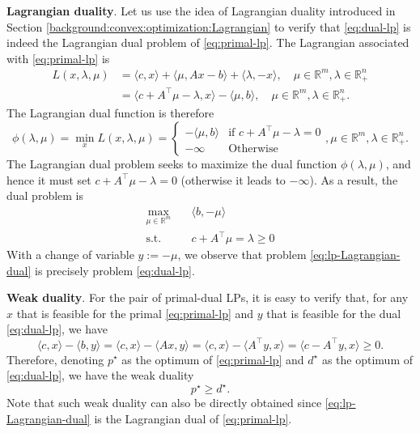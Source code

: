 \documentclass[
]{book}
\theoremstyle{definition}
\theoremstyle{definition}
\theoremstyle{definition}
\theoremstyle{definition}
\theoremstyle{remark}
\begin{document}
\textbf{Lagrangian duality}. Let us use the idea of Lagrangian duality introduced in Section \ref{background:convex:optimization:Lagrangian} to verify that \eqref{eq:dual-lp} is indeed the Lagrangian dual problem of \eqref{eq:primal-lp}. The Lagrangian associated with \eqref{eq:primal-lp} is
\begin{equation}
\begin{split}
L(x,\lambda,\mu) & = \langle c, x \rangle + \langle \mu, Ax - b \rangle + \langle \lambda, -x \rangle, \quad \mu \in \mathbb{R}^{m}, \lambda \in \mathbb{R}^{n}_{+}\\
& = \langle c + A^\top\mu - \lambda, x \rangle - \langle \mu, b \rangle, \quad \mu \in \mathbb{R}^{m}, \lambda \in \mathbb{R}^{n}_{+}.
\end{split}
\end{equation}
The Lagrangian dual function is therefore
\[
\phi(\lambda,\mu) = \min_{x} L(x,\lambda,\mu) = \begin{cases}
- \langle \mu, b \rangle & \text{if } c + A^\top\mu - \lambda = 0 \\
- \infty & \text{Otherwise}
\end{cases}, \mu \in \mathbb{R}^{m}, \lambda \in \mathbb{R}^{n}_{+}.
\]
The Lagrangian dual problem seeks to maximize the dual function \(\phi(\lambda,\mu)\), and hence it must set \(c + A^\top\mu - \lambda = 0\) (otherwise it leads to \(-\infty\)). As a result, the dual problem is
\begin{equation}
\begin{split}
\max_{\mu \in \mathbb{R}^{m}} & \quad \langle b, -\mu \rangle \\
\mathrm{s.t.}& \quad c + A^\top\mu = \lambda \geq 0
\end{split}
\label{eq:lp-Lagrangian-dual}
\end{equation}
With a change of variable \(y := -\mu\), we observe that problem \eqref{eq:lp-Lagrangian-dual} is precisely problem \eqref{eq:dual-lp}.

\textbf{Weak duality}. For the pair of primal-dual LPs, it is easy to verify that, for any \(x\) that is feasible for the primal \eqref{eq:primal-lp} and \(y\) that is feasible for the dual \eqref{eq:dual-lp}, we have
\begin{equation}
\langle c, x \rangle - \langle b, y \rangle = \langle c, x \rangle - \langle Ax, y \rangle = \langle c, x \rangle - \langle A^\top y, x \rangle = \langle c - A^\top y, x \rangle \geq 0.
\label{eq:weak-duality-lp}
\end{equation}
Therefore, denoting \(p^\star\) as the optimum of \eqref{eq:primal-lp} and \(d^\star\) as the optimum of \eqref{eq:dual-lp}, we have the weak duality
\[
p^\star \geq d^\star.
\]
Note that such weak duality can also be directly obtained since \eqref{eq:lp-Lagrangian-dual} is the Lagrangian dual of \eqref{eq:primal-lp}.
\end{document}
